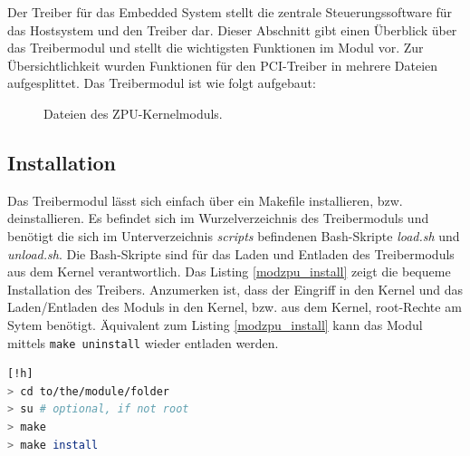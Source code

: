 \documentclass[11pt]{scrartcl}
\begin{document}
Der Treiber für das Embedded System stellt die zentrale Steuerungssoftware für das Hostsystem und den Treiber dar. Dieser Abschnitt gibt einen Überblick über das Treibermodul und stellt die wichtigsten Funktionen im Modul vor. Zur Übersichtlichkeit wurden Funktionen für den PCI-Treiber in mehrere Dateien aufgesplittet. Das Treibermodul ist wie folgt aufgebaut:

\begin{figure}[H]
\begin{center}
\end{center}
\caption{Dateien des ZPU-Kernelmoduls.}
\end{figure}


\subsection{Installation}

Das Treibermodul lässt sich einfach über ein Makefile installieren, bzw. deinstallieren. Es befindet sich im Wurzelverzeichnis des Treibermoduls und benötigt die sich im Unterverzeichnis  \textit{scripts} befindenen Bash-Skripte \textit{load.sh} und \textit{unload.sh}. Die Bash-Skripte sind für das Laden und Entladen des Treibermoduls aus dem Kernel verantwortlich.
Das Listing \ref{modzpu_install} zeigt die bequeme Installation des Treibers. Anzumerken ist, dass der Eingriff in den Kernel und das Laden/Entladen des Moduls in den Kernel, bzw. aus dem Kernel, root-Rechte am Sytem benötigt. Äquivalent zum Listing \ref{modzpu_install} kann das Modul mittels \texttt{make uninstall} wieder entladen werden. 

\begin{lstlisting}[label=modzpu_install,language=bash, caption=Installation des Treibermoduls][!h]
> cd to/the/module/folder
> su # optional, if not root
> make
> make install
\end{lstlisting}
\end{document}
